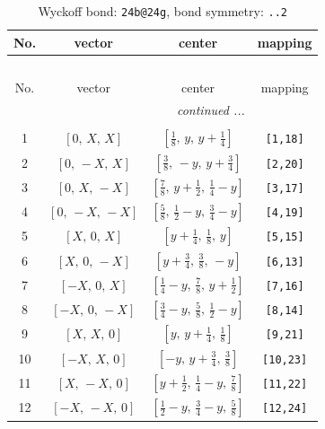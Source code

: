 \documentclass[fleqn,8pt]{jsarticle}
\begin{document}
\renewcommand{\arraystretch}{1.2}
\begin{longtable}{cccc}
\caption{Wyckoff bond: {\tt 24b@24g}, bond symmetry: {\tt ..2}}
 \\
 \hline \hline
No. & vector & center & mapping \\ \hline \endfirsthead

\multicolumn{3}{l}{\tablename\ \thetable{}} \\
 \hline \hline
No. & vector & center & mapping \\ \hline \endhead

 \hline \hline
\multicolumn{3}{r}{\footnotesize\it continued ...} \\ \endfoot

 \hline \hline
\multicolumn{3}{r}{} \\ \endlastfoot

1 & $\left[ 0,\, X,\, X \right]$ & $\left[ \frac{1}{8},\, y,\, y + \frac{1}{4} \right]$ & {\tt [1,18]} \\ \hline
2 & $\left[ 0,\, - X,\, X \right]$ & $\left[ \frac{3}{8},\, - y,\, y + \frac{3}{4} \right]$ & {\tt [2,20]} \\ \hline
3 & $\left[ 0,\, X,\, - X \right]$ & $\left[ \frac{7}{8},\, y + \frac{1}{2},\, \frac{1}{4} - y \right]$ & {\tt [3,17]} \\ \hline
4 & $\left[ 0,\, - X,\, - X \right]$ & $\left[ \frac{5}{8},\, \frac{1}{2} - y,\, \frac{3}{4} - y \right]$ & {\tt [4,19]} \\ \hline
5 & $\left[ X,\, 0,\, X \right]$ & $\left[ y + \frac{1}{4},\, \frac{1}{8},\, y \right]$ & {\tt [5,15]} \\ \hline
6 & $\left[ X,\, 0,\, - X \right]$ & $\left[ y + \frac{3}{4},\, \frac{3}{8},\, - y \right]$ & {\tt [6,13]} \\ \hline
7 & $\left[ - X,\, 0,\, X \right]$ & $\left[ \frac{1}{4} - y,\, \frac{7}{8},\, y + \frac{1}{2} \right]$ & {\tt [7,16]} \\ \hline
8 & $\left[ - X,\, 0,\, - X \right]$ & $\left[ \frac{3}{4} - y,\, \frac{5}{8},\, \frac{1}{2} - y \right]$ & {\tt [8,14]} \\ \hline
9 & $\left[ X,\, X,\, 0 \right]$ & $\left[ y,\, y + \frac{1}{4},\, \frac{1}{8} \right]$ & {\tt [9,21]} \\ \hline
10 & $\left[ - X,\, X,\, 0 \right]$ & $\left[ - y,\, y + \frac{3}{4},\, \frac{3}{8} \right]$ & {\tt [10,23]} \\ \hline
11 & $\left[ X,\, - X,\, 0 \right]$ & $\left[ y + \frac{1}{2},\, \frac{1}{4} - y,\, \frac{7}{8} \right]$ & {\tt [11,22]} \\ \hline
12 & $\left[ - X,\, - X,\, 0 \right]$ & $\left[ \frac{1}{2} - y,\, \frac{3}{4} - y,\, \frac{5}{8} \right]$ & {\tt [12,24]} \\
\end{longtable}
\end{document}
